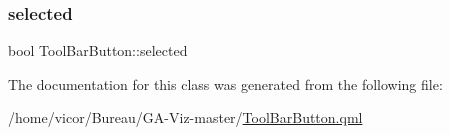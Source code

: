 \subsubsection{\texorpdfstring{selected}{selected}}
{\footnotesize\ttfamily bool Tool\+Bar\+Button\+::selected}



The documentation for this class was generated from the following file\+:\begin{DoxyCompactItemize}
\item 
/home/vicor/\+Bureau/\+G\+A-\/\+Viz-\/master/\hyperlink{_tool_bar_button_8qml}{Tool\+Bar\+Button.\+qml}\end{DoxyCompactItemize}
